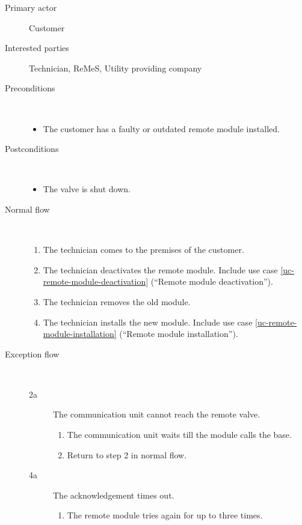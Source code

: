 \begin{description}
	\item[Primary actor] Customer
	\item[Interested parties] Technician, ReMeS, Utility providing company
	\item[Preconditions] \ 
	\begin{itemize}
		\item The customer has a faulty or outdated remote module installed.
	\end{itemize}
	\item[Postconditions] \ 
	\begin{itemize}
		\item The valve is shut down.
	\end{itemize}
	\item[Normal flow] \ 
	\begin{enumerate}
	  	\item The technician comes to the premises of the customer.
	  	\item The technician deactivates the remote module. Include use case
	  	\ref{uc-remote-module-deactivation} (``Remote module deactivation'').
	  	\item The technician removes the old module.
	  	\item The technician installs the new module. Include use case
	  	\ref{uc-remote-module-installation} (``Remote module installation'').
	\end{enumerate}
	\item[Exception flow] \ 
	\begin{description}
		\item[2a] The communication unit cannot reach the remote valve.
		\begin{enumerate}
		  \item The communication unit waits till the module calls the base.
		  \item Return to step 2 in normal flow.
		\end{enumerate}
		\item[4a] The acknowledgement times out.
		\begin{enumerate}
			\item The remote module tries again for up to three times.
		\end{enumerate}
	\end{description}
\end{description}